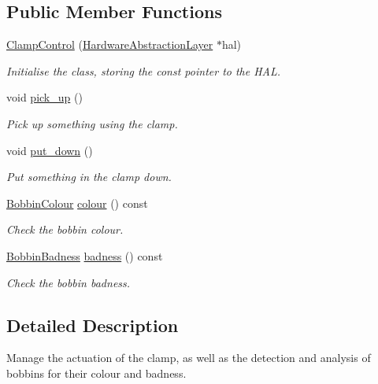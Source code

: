 \subsection*{Public Member Functions}
\begin{DoxyCompactItemize}
\item 
\hyperlink{classIDP_1_1ClampControl_a0359cb52415c35a06521d1130e4f0795}{ClampControl} (\hyperlink{classIDP_1_1HardwareAbstractionLayer}{HardwareAbstractionLayer} $\ast$hal)
\begin{DoxyCompactList}\small\item\em Initialise the class, storing the const pointer to the HAL. \item\end{DoxyCompactList}\item 
void \hyperlink{classIDP_1_1ClampControl_a881ecc4fbc73c47594ecc675b9dbf3e1}{pick\_\-up} ()
\begin{DoxyCompactList}\small\item\em Pick up something using the clamp. \item\end{DoxyCompactList}\item 
void \hyperlink{classIDP_1_1ClampControl_a31573846d9f7c61a6133b9dd465eca25}{put\_\-down} ()
\begin{DoxyCompactList}\small\item\em Put something in the clamp down. \item\end{DoxyCompactList}\item 
\hyperlink{namespaceIDP_a6efd2cca14c0dae1c6458714ce0218df}{BobbinColour} \hyperlink{classIDP_1_1ClampControl_adcb72d77aa298264c67b42e9252f7688}{colour} () const 
\begin{DoxyCompactList}\small\item\em Check the bobbin colour. \item\end{DoxyCompactList}\item 
\hyperlink{namespaceIDP_adf12b2c1e1c228810b18c34a3c88c32d}{BobbinBadness} \hyperlink{classIDP_1_1ClampControl_ab9431b1477cb0785194ed1cfe0b8b328}{badness} () const 
\begin{DoxyCompactList}\small\item\em Check the bobbin badness. \item\end{DoxyCompactList}\end{DoxyCompactItemize}


\subsection{Detailed Description}
Manage the actuation of the clamp, as well as the detection and analysis of bobbins for their colour and badness. 

